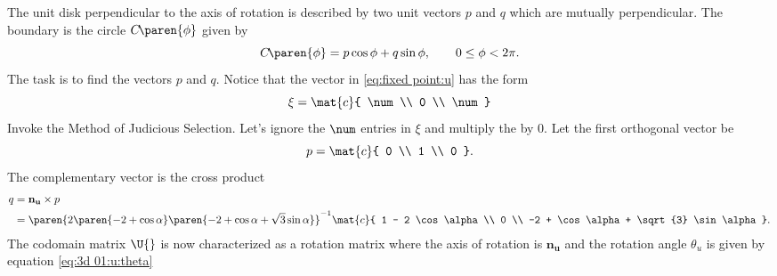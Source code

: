 The unit disk perpendicular to the axis of rotation is described by two unit vectors $p$ and $q$ which are mutually perpendicular. The boundary is the circle $C\!\paren{\phi}$  given by
\begin{equation}
  C\!\paren{\phi} = p \cos \phi + q \sin \phi, \qquad 0 \le \phi < 2 \pi.
  \label{eq:3d 01:unit disk}
\end{equation}
The task is to find the vectors $p$ and $q$. Notice that the vector in \eqref{eq:fixed point:u} has the form
\begin{equation}
  \xi = \mat{c}{ \num \\ 0 \\ \num }
\end{equation}
Invoke the Method of Judicious Selection. Let's ignore the $\num$ entries in $\xi$ and multiply the by 0. Let the first orthogonal vector be
\begin{equation}
  p = \mat{c}{ 0 \\ 1 \\ 0 }.
\end{equation}
The complementary vector is the cross product
\begin{equation}
\begin{split}
  q &= \mathbf{n_{u}} \times p \\
    &= \paren{2 \paren{-2+\cos \alpha} \paren{-2+\cos \alpha + \sqrt{3} \sin \alpha}}^{-1}
       \mat{c}{
       1 - 2 \cos \alpha \\ 0 \\ -2 + \cos \alpha + \sqrt{3} \sin \alpha
       } .
\end{split}
\end{equation}
The codomain matrix $\U{}$ is now characterized as a rotation matrix where the axis of rotation is $\mathbf{n_{u}}$ and the rotation angle $\theta_{u}$ is given by equation \eqref{eq:3d 01:u:theta}

